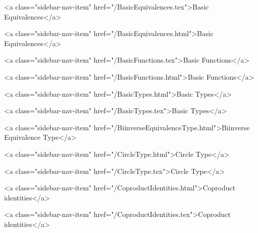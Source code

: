       
    
      
        
          <a class="sidebar-nav-item" href="/BasicEquivalences.tex">Basic Equivalences</a>
        
      
    
      
        
          <a class="sidebar-nav-item" href="/BasicEquivalences.html">Basic Equivalences</a>
        
      
    
      
        
          <a class="sidebar-nav-item" href="/BasicFunctions.tex">Basic Functions</a>
        
      
    
      
        
          <a class="sidebar-nav-item" href="/BasicFunctions.html">Basic Functions</a>
        
      
    
      
        
          <a class="sidebar-nav-item" href="/BasicTypes.html">Basic Types</a>
        
      
    
      
        
          <a class="sidebar-nav-item" href="/BasicTypes.tex">Basic Types</a>
        
      
    
      
        
          <a class="sidebar-nav-item" href="/BiinverseEquivalenceType.html">Biinverse Equivalence Type</a>
        
      
    
      
        
          <a class="sidebar-nav-item" href="/CircleType.html">Circle Type</a>
        
      
    
      
        
          <a class="sidebar-nav-item" href="/CircleType.tex">Circle Type</a>
        
      
    
      
        
          <a class="sidebar-nav-item" href="/CoproductIdentities.html">Coproduct identities</a>
        
      
    
      
        
          <a class="sidebar-nav-item" href="/CoproductIdentities.tex">Coproduct identities</a>
        
